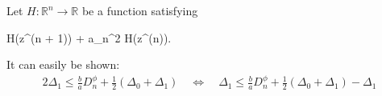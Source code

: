 \documentclass[11pt]{article}
\begin{document}
	Let $H: \mathbb{R}^n \rightarrow \mathbb{R}$ be a function satisfying
	\begin{Lalign}
		H(z^{(n + 1)}) + a\Delta_n^2 \leq H(z^{(n)}).
	\end{Lalign}
	
	It can easily be shown:
	\begin{align}
		2\Delta_1 \leq \frac{b}{a} D_n^\phi + \frac{1}{2}(\Delta_0 + \Delta_1) \quad\Leftrightarrow\quad \Delta_1 \leq \frac{b}{a} D_n^\phi + \frac{1}{2}(\Delta_0 + \Delta_1) - \Delta_1
	\end{align}
\end{document}
